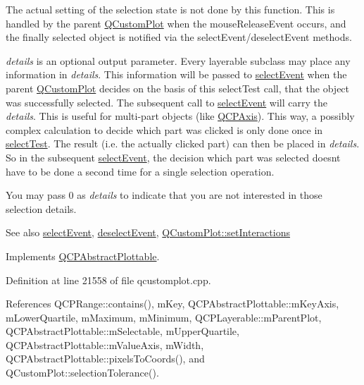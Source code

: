 The actual setting of the selection state is not done by this function. This is handled by the parent \hyperlink{class_q_custom_plot}{Q\+Custom\+Plot} when the mouse\+Release\+Event occurs, and the finally selected object is notified via the select\+Event/deselect\+Event methods.

{\itshape details} is an optional output parameter. Every layerable subclass may place any information in {\itshape details}. This information will be passed to \hyperlink{class_q_c_p_abstract_plottable_a16aaad02456aa23a759efd1ac90c79bf}{select\+Event} when the parent \hyperlink{class_q_custom_plot}{Q\+Custom\+Plot} decides on the basis of this select\+Test call, that the object was successfully selected. The subsequent call to \hyperlink{class_q_c_p_abstract_plottable_a16aaad02456aa23a759efd1ac90c79bf}{select\+Event} will carry the {\itshape details}. This is useful for multi-\/part objects (like \hyperlink{class_q_c_p_axis}{Q\+C\+P\+Axis}). This way, a possibly complex calculation to decide which part was clicked is only done once in \hyperlink{class_q_c_p_statistical_box_a7d3ac843dc48a085740fdfc4319a89cc}{select\+Test}. The result (i.\+e. the actually clicked part) can then be placed in {\itshape details}. So in the subsequent \hyperlink{class_q_c_p_abstract_plottable_a16aaad02456aa23a759efd1ac90c79bf}{select\+Event}, the decision which part was selected doesn\textquotesingle{}t have to be done a second time for a single selection operation.

You may pass 0 as {\itshape details} to indicate that you are not interested in those selection details.

\begin{DoxySeeAlso}{See also}
\hyperlink{class_q_c_p_abstract_plottable_a16aaad02456aa23a759efd1ac90c79bf}{select\+Event}, \hyperlink{class_q_c_p_abstract_plottable_a6fa0d0f95560ea8b01ee13f296dab2b1}{deselect\+Event}, \hyperlink{class_q_custom_plot_a5ee1e2f6ae27419deca53e75907c27e5}{Q\+Custom\+Plot\+::set\+Interactions} 
\end{DoxySeeAlso}


Implements \hyperlink{class_q_c_p_abstract_plottable_a38efe9641d972992a3d44204bc80ec1d}{Q\+C\+P\+Abstract\+Plottable}.



Definition at line 21558 of file qcustomplot.\+cpp.



References Q\+C\+P\+Range\+::contains(), m\+Key, Q\+C\+P\+Abstract\+Plottable\+::m\+Key\+Axis, m\+Lower\+Quartile, m\+Maximum, m\+Minimum, Q\+C\+P\+Layerable\+::m\+Parent\+Plot, Q\+C\+P\+Abstract\+Plottable\+::m\+Selectable, m\+Upper\+Quartile, Q\+C\+P\+Abstract\+Plottable\+::m\+Value\+Axis, m\+Width, Q\+C\+P\+Abstract\+Plottable\+::pixels\+To\+Coords(), and Q\+Custom\+Plot\+::selection\+Tolerance().


